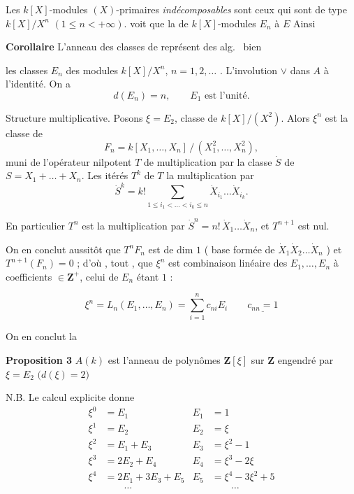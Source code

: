 \documentclass[11pt,a4paper]{article}
\begin{document}
Les $k[X]$-modules $(X)$-primaires \emph{indécomposables} sont ceux qui sont de
type $k[X]/X^{n}$ $(1 \leq n < +\infty)$. \ill{} voit  que
la \struck{\ill{}} \ill{} de $k[X]$-modules $E_{n}$ \ill{}
 à $E$ \ill{} Ainsi

\textbf{Corollaire} L'anneau  des classes de représent\ill{} des
\ill{} alg.\ \ill{} \ill{} bien \ill{}


les classes $E_{n}$ des modules $k[X]/X^{n}$, $n = 1, 2, \ldots$ . L'involution
$\vee$ dans $A$ \ill{} à l'identité. On a
\[ d(E_{n}) = n , \qquad E_{1} \text{ est l'unité} . \]

Structure multiplicative. Posons $\xi = E_{2}$, classe de $k[X]/(X^{2})$. Alors
$\xi^{n}$ est la classe de
\[ F_{n} = k[X_{1}, \ldots, X_{n}]\,/\,(X_{1}^{2}, \ldots, X_{n}^{2}) , \]
muni de l'opérateur nilpotent $T$ de multiplication par la classe $\dot{S}$ de
$S = X_{1} + \ldots + X_{n}$. Les \ill{} itérés $T^{k}$ de $T$ \ill{} la
multiplication par
\[ \dot{S}^{k} = k! \sum_{1 \leq i_{1} < \ldots < i_{k} \leq n}
      \dot{X}_{i_{1}} \ldots \dot{X}_{i_{k}} . \]


En particulier $T^{n}$ est la multiplication par
$\dot{S}^{n} = n!\, \dot{X}_{1} \ldots \dot{X}_{n}$, et $T^{n+1}$ est nul.

On en conclut aussitôt que $T^{n} F_{n}$ est de dim $1$ ( base formée de
$\dot{X}_{1} \dot{X}_{2} \ldots \dot{X}_{n}$ ) et $T^{n+1}(F_{n}) = 0$ ; d'où
\ill{}, tout , que \struck{\ill{}} $\xi^{n}$ est \ill{}
combinaison linéaire des $E_{1}, \ldots, E_{n}$ à coefficients
$\in \mathbf{Z}^{+}$, celui de $E_{n}$ étant $1$ :


\[ \xi^{n} = L_{n}(E_{1}, \ldots, E_{n}) = \sum_{i=1}^{n} c_{ni} E_{i}
   \qquad \underline{c_{nn} = 1} \]

On en conclut la

\textbf{Proposition 3} $A(k)$ est l'anneau de polynômes $\mathbf{Z}[\xi]$ sur
$\mathbf{Z}$ engendré par $\xi = E_{2}$ $\bigl( d(\xi) = 2 \bigr)$

N.B. Le calcul explicite donne
\begin{align*}
\xi^{0} &= E_{1}                    &  E_{1} &= 1 \\
\xi^{1} &= E_{2}                    &  E_{2} &= \xi \\
\xi^{2} &= E_{1} + E_{3}            &  E_{3} &= \xi^{2} - 1 \\
\xi^{3} &= 2 E_{2} + E_{4}          &  E_{4} &= \xi^{3} - 2\xi \\
\xi^{4} &= 2 E_{1} + 3 E_{3} + E_{5} & E_{5} &= \xi^{4} - 3\xi^{2} + 5 \\
        &\qquad \ldots               &        &\qquad \ldots
\end{align*}
\end{document}
